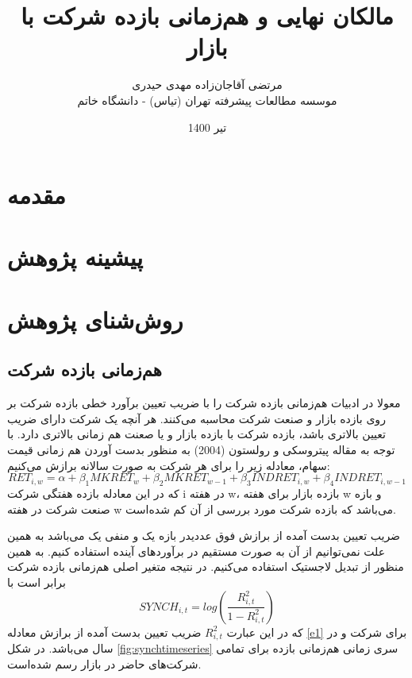 \documentclass[12pt, a4paper]{article}
\title{مالکان نهایی و هم‌زمانی بازده شرکت با بازار}
\author{
	مرتضی آقاجان‌زاده
	 \sym{*} 
	\qquad 
	مهدی حیدری 
	\sym{*} 
	 \\
	\sym{*} 
	\footnotesize  موسسه مطالعات پیشرفته تهران (تیاس) - دانشگاه خاتم
}
\date{
تیر 1400}
\begin{document}
\maketitle

\section{مقدمه}
\section{پیشینه پژوهش}
\section{روش‌شنای پژوهش}
\subsection{هم‌زمانی بازده شرکت}
معولا در ادبیات هم‌زمانی بازده شرکت را با ضریب تعیین برآورد خطی بازده شرکت بر روی بازده بازار و صنعت شرکت محاسبه می‌کنند. هر آنچه یک شرکت دارای ضریب تعیین بالاتری باشد، بازده شرکت با بازده بازار و یا صعنت هم زمانی بالاتری دارد. 
با توجه به مقاله 
پیتروسکی و رولستون (2004)
به منظور بدست آوردن هم زمانی قیمت سهام، معادله زیر را برای هر شرکت به صورت سالانه برازش می‌کنیم:
	\begin{equation}\label{e1}
		RET_{i,w} = \alpha + \beta_1 MKRET_{w}+ \beta_2 MKRET_{w-1}  + \beta_3 INDRET_{i,w} + \beta_4 INDRET_{i,w-1} 
	\end{equation}
	که در این معادله 
	بازده هفتگی شرکت i در هفته w، 
	بازده بازار برای هفته w و
	بازه صنعت شرکت در هفته w می‌باشد که بازده شرکت مورد بررسی از آن کم شده‌است. 
	
	ضریب تعیین بدست آمده از برازش فوق عددیدر بازه یک و منفی یک می‌باشد به همین علت نمی‌توانیم از آن به صورت مستقیم در برآورد‌های آینده استفاده کنیم. به همین منظور از تبدیل لاجستیک استفاده می‌کنیم. در نتیجه متغیر اصلی هم‌زمانی بازده شرکت برابر است با 	
	\begin{equation}
		SYNCH_{i,t} = log(\frac{R^2_{i,t}}{1-R^2_{i,t}})
	\end{equation}
که در این عبارت $  R^2_{i,t}$ ضریب تعیین بدست آمده از برازش معادله 
\ref{e1}
برای شرکت
  و در سال
  می‌باشد. در شکل
  \ref{fig:synchtimeseries} 
  سری زمانی هم‌زمانی بازده برای تمامی شرکت‌های حاضر در بازار رسم شده‌است.
  
\end{document}
